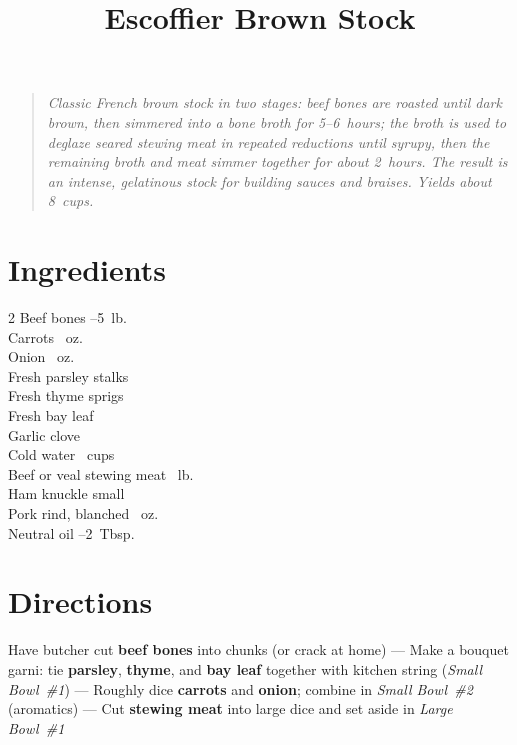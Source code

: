 \documentclass[11pt,letterpaper]{article}
\title{Escoffier Brown Stock}
\author{}
\date{}
\begin{document}
\maketitle
\thispagestyle{empty}

\begin{quote}
\textit{Classic French brown stock in two stages: beef bones are roasted until dark brown, then simmered into a bone broth for 5--6~hours; the broth is used to deglaze seared stewing meat in repeated reductions until syrupy, then the remaining broth and meat simmer together for about 2~hours. The result is an intense, gelatinous stock for building sauces and braises. Yields about 8~cups.}
\end{quote}

\section*{Ingredients}

\setlength{\columnsep}{20pt}
\begin{multicols}{2}
\noindent
    Beef bones --5~lb. \\
    Carrots ~oz. \\
    Onion ~oz. \\
    Fresh parsley stalks  \\
    Fresh thyme sprigs  \\
    Fresh bay leaf  \\
    Garlic clove  \\
    Cold water ~cups \\
    \columnbreak
    Beef or veal stewing meat ~lb. \\
    Ham knuckle  small \\
    Pork rind, blanched ~oz. \\
    Neutral oil --2~Tbsp. \\
\end{multicols}

\section*{Directions}

\noindent
Have butcher cut \textbf{beef bones} into chunks (or crack at home) ---
Make a bouquet garni: tie \textbf{parsley}, \textbf{thyme}, and \textbf{bay leaf} together with kitchen string (\textit{Small Bowl~\#1}) ---
Roughly dice \textbf{carrots} and \textbf{onion}; combine in \textit{Small Bowl~\#2} (aromatics) ---
Cut \textbf{stewing meat} into large dice and set aside in \textit{Large Bowl~\#1}
\end{document}
